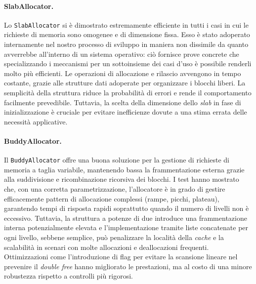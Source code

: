 \paragraph{SlabAllocator.}
Lo \texttt{SlabAllocator} si è dimostrato estremamente efficiente in tutti i casi in cui le richieste di memoria sono omogenee e di dimensione fissa. Esso è stato adoperato internamente nel nostro processo di sviluppo in maniera non dissimile da quanto avverrebbe all'interno di un sistema operativo: ciò fornisce prove concrete che specializzando i meccanismi per un sottoinsieme dei casi d'uso è possibile renderli molto più efficienti. Le operazioni di allocazione e rilascio avvengono in tempo costante, grazie alle strutture dati adoperate per organizzare i blocchi liberi. La semplicità della struttura riduce la probabilità di errori e rende il comportamento facilmente prevedibile. Tuttavia, la scelta della dimensione dello \textit{slab} in fase di inizializzazione è cruciale per evitare inefficienze dovute a una stima errata delle necessità applicative. 

\paragraph{BuddyAllocator.}
Il \texttt{BuddyAllocator} offre una buona soluzione per la gestione di richieste di memoria a taglia variabile, mantenendo bassa la frammentazione esterna grazie alla suddivisione e ricombinazione ricorsiva dei blocchi. I test hanno mostrato che, con una corretta parametrizzazione, l’allocatore è in grado di gestire efficacemente pattern di allocazione complessi (rampe, picchi, plateau), garantendo tempi di risposta rapidi soprattutto quando il numero di livelli non è eccessivo. Tuttavia, la struttura a potenze di due introduce una frammentazione interna potenzialmente elevata e l’implementazione tramite liste concatenate per ogni livello, sebbene semplice, può penalizzare la località della \textit{cache} e la scalabilità in scenari con molte allocazioni e deallocazioni frequenti. Ottimizzazioni come l’introduzione di flag per evitare la scansione lineare nel prevenire il \textit{double free} hanno migliorato le prestazioni, ma al costo di una minore robustezza rispetto a controlli più rigorosi.

